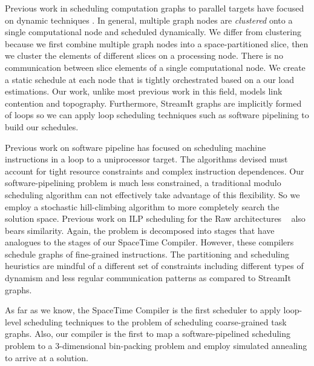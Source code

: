Previous work in scheduling computation graphs to parallel targets
have focused on dynamic techniques \cite{SDFSched, SDFSched2,
may87communicating, DAGSched}. In general, multiple graph nodes are
{\it clustered} onto a single computational node and scheduled
dynamically.  We differ from clustering because we first combine
multiple graph nodes into a space-partitioned slice, then we cluster
the elements of different slices on a processing node. There is no
communication between slice elements of a single computational node.
We create a static schedule at each node that is tightly orchestrated
based on a our load estimations. Our work, unlike most previous work
in this field, models link contention and topography.  Furthermore,
StreamIt graphs are implicitly formed of loops so we can apply loop
scheduling techniques such as software pipelining to build our
schedules.


Previous work on software pipeline has focused on scheduling machine
instructions in a loop \cite{lam-softpipe, rau-softpipe} to a
uniprocessor target.  The algorithms devised must account for tight
resource constraints and complex instruction dependences.  Our
software-pipelining problem is much less constrained, a traditional
modulo scheduling algorithm can not effectively take advantage of this
flexibility.  So we employ a stochastic hill-climbing algorithm to
more completely search the solution space.  Previous work on ILP
scheduling for the Raw architectures ~\cite{lee98spacetime} also bears
similarity. Again, the problem is decomposed into stages that have
analogues to the stages of our SpaceTime Compiler.  However, these
compilers schedule graphs of fine-grained instructions. The
partitioning and scheduling heuristics are mindful of a different set
of constraints including different types of dynamism and less regular
communication patterns as compared to StreamIt graphs.

As far as we know, the SpaceTime Compiler is the first scheduler to
apply loop-level scheduling techniques to the problem
of scheduling coarse-grained task graphs.  Also, our compiler is the first
to map a software-pipelined scheduling problem to a 3-dimensional
bin-packing problem and employ simulated annealing to arrive at a solution.

%
